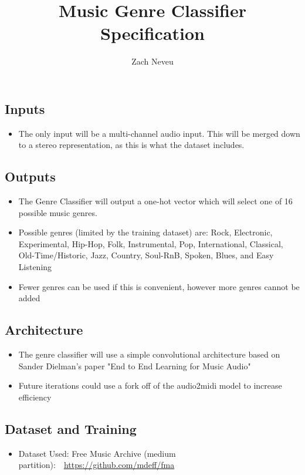 \documentclass[12pt, letter]{article}
\author{Zach Neveu}
\title{ Music Genre Classifier Specification }
\begin{document}
\maketitle

\subsection*{Inputs}
\begin{itemize}
	\item The only input will be a multi-channel audio input. This will be merged down to a stereo representation, as this is what the dataset includes.
\end{itemize}

\subsection*{Outputs}
\begin{itemize}
	\item The Genre Classifier will output a one-hot vector which will select one of 16 possible music genres.
	\item Possible genres (limited by the training dataset) are: Rock, Electronic, Experimental, Hip-Hop, Folk, Instrumental, Pop, International, Classical, Old-Time/Historic, Jazz, Country, Soul-RnB, Spoken, Blues, and Easy Listening
	\item Fewer genres can be used if this is convenient, however more genres cannot be added
\end{itemize}

\subsection*{Architecture}
\begin{itemize}
	\item The genre classifier will use a simple convolutional architecture based on Sander Dielman's paper "End to End Learning for Music Audio"
	\item Future iterations could use a fork off of the audio2midi model to increase efficiency
\end{itemize}

\subsection*{Dataset and Training}
\begin{itemize}
	\item Dataset Used: Free Music Archive (medium partition):\ \  \href{FMA}{https://github.com/mdeff/fma}
\end{itemize}
\end{document}
